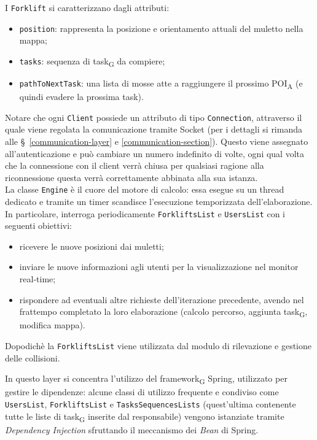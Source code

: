 I \texttt{Forklift} si caratterizzano dagli attributi:
\begin{itemize}
	\item \texttt{position}: rappresenta la posizione e orientamento attuali del muletto nella mappa;
	\item \texttt{tasks}: sequenza di task\textsubscript{G} da compiere;
	\item \texttt{pathToNextTask}: una lista di mosse atte a raggiungere il prossimo POI\textsubscript{A} (e quindi evadere la prossima task).
\end{itemize}

Notare che ogni \texttt{Client} possiede un attributo di tipo \texttt{Connection}, attraverso il quale viene regolata la comunicazione tramite Socket (per i dettagli si rimanda alle \S\ \ref{communication-layer} e \ref{communication-section}). Questo viene assegnato all'autenticazione e può cambiare un numero indefinito di volte, ogni qual volta che la connessione con il client verrà chiusa per qualsiasi ragione alla riconnessione questa verrà correttamente abbinata alla sua istanza.\\

La classe \texttt{Engine} è il cuore del motore di calcolo: essa esegue su un thread dedicato e tramite un timer scandisce l'esecuzione temporizzata dell'elaborazione. In particolare, interroga periodicamente \texttt{ForkliftsList} e \texttt{UsersList} con i seguenti obiettivi:
\begin{itemize}
	\item ricevere le nuove posizioni dai muletti;
	\item inviare le nuove informazioni agli utenti per la visualizzazione nel monitor real-time;
	\item rispondere ad eventuali altre richieste dell'iterazione precedente, avendo nel frattempo completato la loro elaborazione (calcolo percorso, aggiunta task\textsubscript{G}, modifica mappa).
\end{itemize}
Dopodichè la \texttt{ForkliftsList} viene utilizzata dal modulo di rilevazione e gestione delle collisioni.

In questo layer si concentra l'utilizzo del framework\textsubscript{G} Spring, utilizzato per gestire le dipendenze: alcune classi di utilizzo frequente e condiviso come \texttt{UsersList}, \texttt{ForkliftsList} e \texttt{TasksSequencesLists} (quest'ultima contenente tutte le liste di task\textsubscript{G} inserite dal responsabile) vengono istanziate tramite \textit{Dependency Injection} sfruttando il meccanismo dei \textit{Bean} di Spring.


